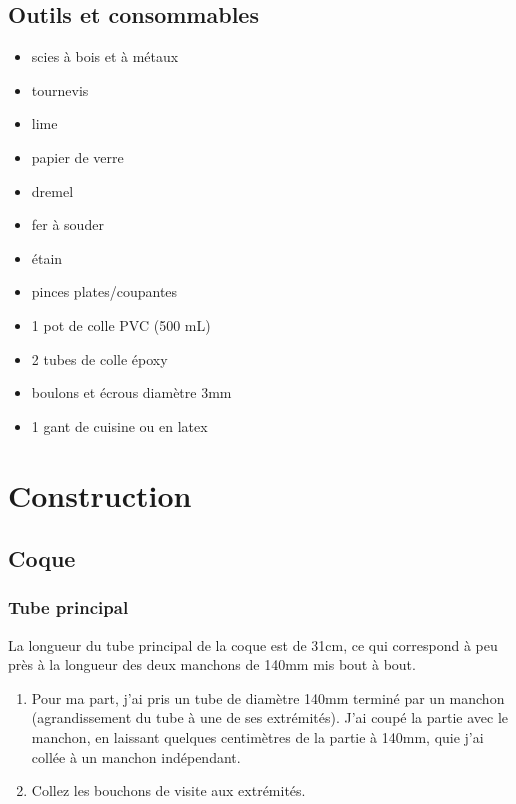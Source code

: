\documentclass[11pt,a4paper]{article}
\begin{document}
    \subsection{Outils et consommables}
      \begin{itemize}
        \setlength\itemsep{-2mm}
        \item scies à bois et à métaux
        \item tournevis
        \item lime
        \item papier de verre
        \item dremel
        \item fer à souder
        \item étain
        \item pinces plates/coupantes
        \item 1 pot de colle PVC (500 mL)
        \item 2 tubes de colle époxy
        \item boulons et écrous diamètre 3mm
        \item 1 gant de cuisine ou en latex
      \end{itemize}


    \section{Construction}
      \subsection{Coque}
        
        \subsubsection{Tube principal}
          La longueur du tube principal de la coque est de 31cm, ce qui correspond à peu près à la longueur des deux manchons de 140mm mis bout à bout.
          \begin{enumerate}
            \item Pour ma part, j'ai pris un tube de diamètre 140mm terminé par un manchon (agrandissement du tube à une de ses extrémités). J'ai coupé la partie avec le manchon, en laissant quelques centimètres de la partie à 140mm, quie j'ai collée à un manchon indépendant.
            
            \item Collez les bouchons de visite aux extrémités.
          \end{enumerate}
          
\end{document}
